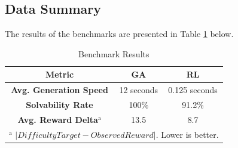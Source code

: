 \subsection{Data Summary}
The results of the benchmarks are presented in Table \ref{tab:benchmark-results} below.

\begin{table}[htbp]
  \caption{Benchmark Results}
  \begin{center}
    \begin{tabular}{|c|c|c|}
      \hline
      \textbf{Metric}                           & \textbf{GA} & \textbf{RL}   \\
      \hline
      \textbf{Avg. Generation Speed}            & 12 seconds  & 0.125 seconds \\
      \hline
      \textbf{Solvability Rate}                 & 100\%       & 91.2\%        \\
      \hline
      \textbf{Avg. Reward Delta}$^{\mathrm{a}}$ & 13.5        & 8.7           \\
      \hline
      \multicolumn{3}{l}{$^{\mathrm{a}}$ $|Difficulty Target - Observed Reward|$. Lower is better.}
    \end{tabular}
    \label{tab:benchmark-results}
  \end{center}
\end{table}




